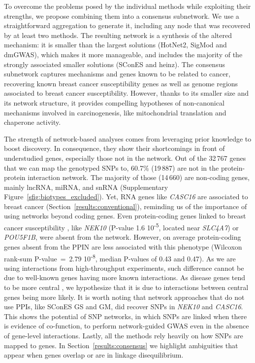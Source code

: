 \documentclass[twocolumn, 11pt]{article}
\begin{document}
To overcome the problems posed by the individual methods while exploiting their strengths, we propose combining them into a consensus subnetwork. We use a straightforward aggregation to generate it, including any node that was recovered by at least two methods. The resulting network is a synthesis of the altered mechanism: it is smaller than the largest solutions (HotNet2, SigMod and dmGWAS), which makes it more manageable, and includes the majority of the strongly associated smaller solutions (SConES and heinz). The consensus subnetwork captures mechanisms and genes known to be related to cancer, recovering known breast cancer susceptibility genes as well as genome regions associated to breast cancer susceptibility. However, thanks to its smaller size and its network structure, it provides compelling hypotheses of non-canonical mechanisms involved in carcinogenesis, like mitochondrial translation and chaperone activity.

The strength of network-based analyses comes from leveraging prior knowledge to boost discovery. In consequence, they show their shortcomings in front of understudied genes, especially those not in the network. Out of the 32\,767 genes that we can map the genotyped SNPs to, 60.7\% (19\,887) are not in the protein-protein interaction network. The majority of those (14\,660) are non-coding genes, mainly lncRNA, miRNA, and snRNA (Supplementary Figure~\ref{sfig:biotypes_excluded}). Yet, RNA genes like \emph{CASC16} are associated to breast cancer (Section~\ref{results:conventional}), reminding us of the importance of using networks beyond coding genes. Even protein-coding genes linked to breast cancer susceptibility \cite{ahmed_newly_2009}, like \emph{NEK10} (P-value 1.6 \texttimes{} 10\textsuperscript{-5}, located near \emph{SLC4A7}) or \emph{POU5F1B}, were absent from the network. However, on average protein-coding genes absent from the PPIN are less associated with this phenotype (Wilcoxon rank-sum P-value~=~2.79 \texttimes{} 10\textsuperscript{-8}, median P-values of 0.43 and 0.47). As we are using interactions from high-throughput experiments, such difference cannot be due to well-known genes having more known interactions. As disease genes tend to be more central \cite{pinero_uncovering_2016}, we hypothesize that it is due to interactions between central genes being more likely. It is worth noting that network approaches that do not use PPIs, like SConES GS and GM, did recover SNPs in \emph{NEK10} and \emph{CASC16}. This shows the potential of SNP networks, in which SNPs are linked when there is evidence of co-function, to perform network-guided GWAS even in the absence of gene-level interactions. Lastly, all the methods rely heavily on how SNPs are mapped to genes. In Section~\ref{results:consensus} we highlight ambiguities that appear when genes overlap or are in linkage disequilibrium.
\end{document}

